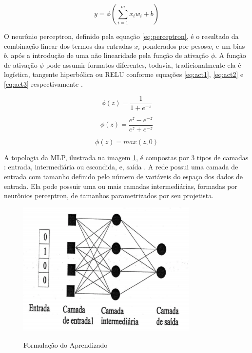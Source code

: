 \begin{equation}
y = \phi(\sum_{i = 1}^{m}{x_i  w_i} + b)
\label{eq:perceptron}
\end{equation}

O neurônio perceptron, definido pela equação \ref{eq:perceptron}, é o resultado da combinação linear dos termos das entradas $x_i$ ponderados por pesos$w_i$ e um bias $b$, após a introdução de uma não linearidade pela função de ativação $\phi$. A função de ativação $\phi$ pode assumir formatos diferentes, todavia, tradicionalmente ela é logística, tangente hiperbólica ou RELU conforme equações \ref{eq:act1}, \ref{eq:act2} e \ref{eq:act3} respectivamente \cite{Goodfellow-et-al-2016}.

\begin{equation}
\phi(z) = \frac{1}{1 + e^{-z}}
\label{eq:act1}
\end{equation}

\begin{equation}
\phi(z) = \frac{e^z - e^{-z}}{e^z + e^{-z}}
\label{eq:act2}
\end{equation}

\begin{equation}
\phi(z) = max(z, 0)
\label{eq:act3}
\end{equation}
%

A topologia da MLP, ilustrada na imagem \ref{fig:MLPDraw}, é compostas por 3 tipos de camadas : entrada, intermediária ou escondida, e, saída  \cite{Braga2007}. A rede possui uma camada de entrada com tamanho definido pelo número de variáveis do espaço dos dados de entrada. Ela pode possuir uma ou mais camadas intermediárias, formadas por neurônios perceptron, de tamanhos parametrizados por seu projetista. 

\begin{figure}[!htb]
	\centering
	\caption{Formulação do Aprendizado} 
	\includegraphics[width=0.8\textwidth]{./04-figuras/mlp.png} \\
	\cite{Braga2007}
	\label{fig:MLPDraw}
\end{figure}

